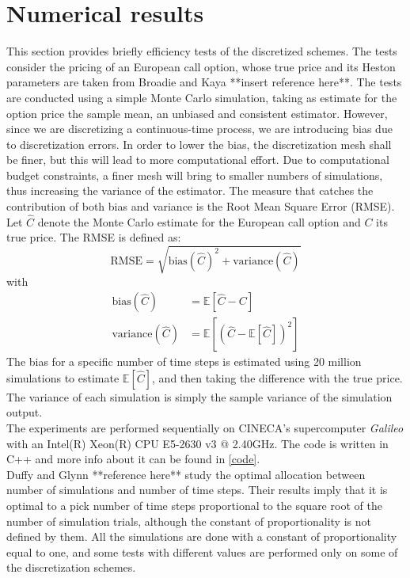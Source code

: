 \documentclass[12pt]{article}
\numberwithin{equation}{section}
\begin{document}
\section{Numerical results}
This section provides briefly efficiency tests of the discretized schemes. The tests consider the pricing of an European call option, whose true price and its Heston parameters are taken from Broadie and Kaya **insert reference here**. The tests are conducted using a simple Monte Carlo simulation, taking as estimate for the option price the sample mean, an unbiased and consistent estimator. However, since we are discretizing a continuous-time process, we are introducing bias due to discretization errors. In order to lower the bias, the discretization mesh shall be finer, but this will lead to more computational effort. Due to computational budget constraints, a finer mesh will bring to smaller numbers of simulations, thus increasing the variance of the estimator. The measure that catches the contribution of both bias and variance is the Root Mean Square Error (RMSE). Let $\hat{C}$ denote the Monte Carlo estimate for the European call option and $C$ its true price. The RMSE is defined as: \\
\begin{equation}
\text{RMSE} = \sqrt{\text{bias}(\hat{C})^2 + \text{variance}(\hat{C})}
\end{equation}
with
\begin{align}
\text{bias}(\hat{C}) &= \mathbb{E}[\hat{C}-C] \\
\text{variance}(\hat{C}) &= \mathbb{E}[(\hat{C}-\mathbb{E}[\hat{C}])^2]
\end{align}
The bias for a specific number of time steps is estimated using 20 million simulations to estimate $\mathbb{E}[\hat{C}]$, and then taking the difference with the true price. The variance of each simulation is simply the sample variance of the simulation output.\\
\newline
The experiments are performed sequentially on CINECA's supercomputer \textit{Galileo} with an Intel(R) Xeon(R) CPU E5-2630 v3 @ 2.40GHz. The code is written in C++ and more info about it can be found in \ref{code}.\\
\newline
Duffy and Glynn **reference here** study the optimal allocation between number of simulations and number of time steps. Their results imply that it is optimal to a pick number of time steps proportional to the square root of the number of simulation trials, although the constant of proportionality is not defined by them. All the simulations are done with a constant of proportionality equal to one, and some tests with different values are performed only on some of the discretization schemes. \\
\end{document}
